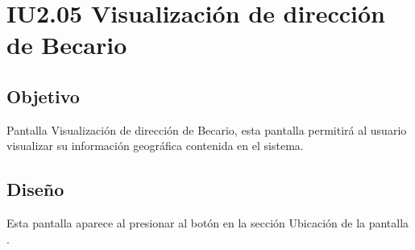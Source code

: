 \newpage
\section{IU2.05 Visualización de dirección de Becario}

\subsection{Objetivo}
	Pantalla Visualización de dirección de Becario, esta pantalla permitirá al usuario visualizar su información geográfica contenida en el sistema.
	


\subsection{Diseño}
	Esta pantalla aparece al presionar al botón  en la sección Ubicación de la pantalla .

	
